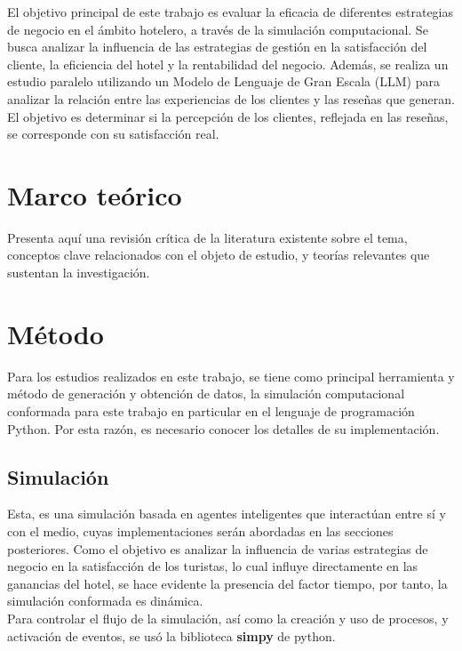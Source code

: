 \documentclass[12pt,a4paper]{article} \usepackage[spanish]{babel} \usepackage{graphicx} \usepackage{amsmath} \usepackage{amsfonts} \usepackage{amssymb} \usepackage{float} \usepackage{geometry}
\begin{document}
El objetivo principal de este trabajo es evaluar la eficacia de diferentes estrategias de negocio en el ámbito hotelero, a través de la simulación computacional. Se busca analizar la influencia de las estrategias de gestión en la satisfacción del cliente, la eficiencia del hotel y la rentabilidad del negocio. Además, se realiza un estudio paralelo utilizando un Modelo de Lenguaje de Gran Escala (LLM) para analizar la relación entre las experiencias de los clientes y las reseñas que generan. El objetivo es determinar si la percepción de los clientes, reflejada en las reseñas, se corresponde con su satisfacción real.

\section{Marco teórico}

Presenta aquí una revisión crítica de la literatura existente sobre el tema, conceptos clave relacionados con el objeto de estudio, y teorías relevantes que sustentan la investigación.

\section{Método}

Para los estudios realizados en este trabajo, se tiene como principal herramienta y método de generación y obtención de datos, la simulación computacional conformada para este trabajo en particular en el lenguaje de programación Python. Por esta razón, es necesario conocer los detalles de su implementación.

\subsection{Simulación}
Esta, es una simulación basada en agentes inteligentes que interactúan entre sí y con el medio, cuyas implementaciones serán abordadas en las secciones posteriores. Como el objetivo es analizar la influencia de varias estrategias de negocio en la satisfacción de los turistas, lo cual influye directamente en las ganancias del hotel, se hace evidente la presencia del factor tiempo, por tanto, la simulación conformada es dinámica.\\
Para controlar el flujo de la simulación, así como la creación y uso de procesos, y activación de eventos, se usó la biblioteca \textbf{simpy} de python.
\end{document}
